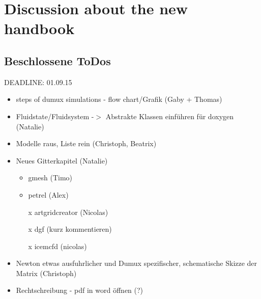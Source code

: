 \chapter*{Discussion about the new handbook}
\section*{Beschlossene ToDos}
DEADLINE: 01.09.15
\begin{itemize}
  \item steps of dumux simulations - flow chart/Grafik (Gaby + Thomas)
  \item Fluidstate/Fluidsystem -$>$ Abstrakte Klassen einführen für doxygen (Natalie)
  \item Modelle raus, Liste rein (Christoph, Beatrix)
  \item Neues Gitterkapitel (Natalie)
  \begin{itemize}
    \item gmesh (Timo)
    \item petrel (Alex)
    \item[x] artgridcreator (Nicolas)
    \item[x] dgf (kurz kommentieren)
    \item[x] icemcfd (nicolas)
  \end{itemize}
  \item Newton etwas ausfuhrlicher und Dumux spezifischer, schematische
        Skizze der Matrix (Christoph)
  \item Rechtschreibung - pdf in word öffnen (?)
\end{itemize}

